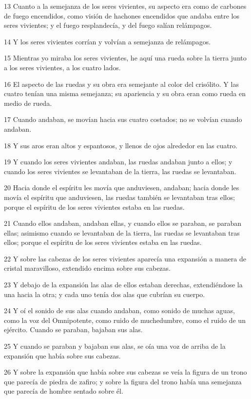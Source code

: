 \par 13 Cuanto a la semejanza de los seres vivientes, su aspecto era como de carbones de fuego encendidos, como visión de hachones encendidos que andaba entre los seres vivientes; y el fuego resplandecía, y del fuego salían relámpagos.
\par 14 Y los seres vivientes corrían y volvían a semejanza de relámpagos.
\par 15 Mientras yo miraba los seres vivientes, he aquí una rueda sobre la tierra junto a los seres vivientes, a los cuatro lados.
\par 16 El aspecto de las ruedas y su obra era semejante al color del crisólito. Y las cuatro tenían una misma semejanza; su apariencia y su obra eran como rueda en medio de rueda.
\par 17 Cuando andaban, se movían hacia sus cuatro costados; no se volvían cuando andaban.
\par 18 Y sus aros eran altos y espantosos, y llenos de ojos alrededor en las cuatro.
\par 19 Y cuando los seres vivientes andaban, las ruedas andaban junto a ellos; y cuando los seres vivientes se levantaban de la tierra, las ruedas se levantaban.
\par 20 Hacia donde el espíritu les movía que anduviesen, andaban; hacia donde les movía el espíritu que anduviesen, las ruedas también se levantaban tras ellos; porque el espíritu de los seres vivientes estaba en las ruedas.
\par 21 Cuando ellos andaban, andaban ellas, y cuando ellos se paraban, se paraban ellas; asimismo cuando se levantaban de la tierra, las ruedas se levantaban tras ellos; porque el espíritu de los seres vivientes estaba en las ruedas. 
\par 22 Y sobre las cabezas de los seres vivientes aparecía una expansión a manera de cristal maravilloso, extendido encima sobre sus cabezas.
\par 23 Y debajo de la expansión las alas de ellos estaban derechas, extendiéndose la una hacia la otra; y cada uno tenía dos alas que cubrían su cuerpo.
\par 24 Y oí el sonido de sus alas cuando andaban, como sonido de muchas aguas, como la voz del Omnipotente, como ruido de muchedumbre, como el ruido de un ejército. Cuando se paraban, bajaban sus alas.
\par 25 Y cuando se paraban y bajaban sus alas, se oía una voz de arriba de la expansión que había sobre sus cabezas.
\par 26 Y sobre la expansión que había sobre sus cabezas se veía la figura de un trono que parecía de piedra de zafiro; y sobre la figura del trono había una semejanza que parecía de hombre sentado sobre él. 
